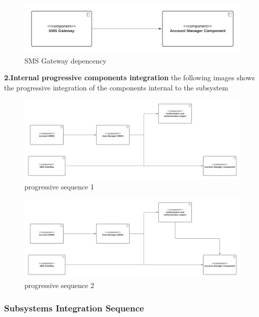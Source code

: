 \begin{itemize}
    \begin{figure}[h!]
        \centering
        \includegraphics[width=.8\textwidth]{Images/TestDiagram/Account/ExternalDependenciesSMS.png}
        \caption{\label{fig:AccountExternalDepSMS}{SMS Gateway depencency}}
    \end{figure}
    \FloatBarrier  
    \textbf{2.Internal progressive components integration } the following images shows the progressive integration of the components internal to the subsystem
    \begin{figure}[h!]
        \centering
        \includegraphics[width=1\textwidth]{Images/TestDiagram/Account/subAccount1.png}
        \caption{\label{fig:progressiveAccount1}{progressive sequence 1}}
    \end{figure}
    \FloatBarrier 
    \begin{figure}[h!]
        \centering
        \includegraphics[width=1\textwidth]{Images/TestDiagram/Account/subAccount2.png}
        \caption{\label{fig:progressiveAccount1}{progressive sequence 2}}
    \end{figure}
    \FloatBarrier 

\end{itemize}


\subsubsection{Subsystems Integration Sequence}
\label{subsect: subsytemintegrationsequence}

